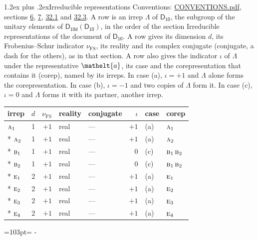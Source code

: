 \documentclass[10pt,a4paper]{article}
\makeatletter
\renewcommand\section{\@startsection{section}{1}{\z@}{-3ex plus -1ex minus -.2ex}%
  {1.2ex plus .2ex}{\normalfont\large\sffamily\bfseries\color{parttitle}}}
\newcommand{\needspace}[1]{\par\penalty-100\begingroup\dimen0=#1\relax\dimen2=\pagegoal
  \advance\dimen2-\pagetotal\ifdim\dimen0>\dimen2\relax\ifdim\dimen2>0pt\vfil\break\fi\fi
  \endgroup}
\numberwithin{equation}{section}
\newcommand{\eltfont}[1]{{\let\sigma\eltsigma\mathelt{#1}}}
\newcommand{\grp}[1]{\mathsf{#1}}
\newcommand{\irr}[1]{\text{\normalfont\scshape #1}}
\newcommand{\elt}[1]{\eltfont{#1}}
\newcommand{\fsind}{\nu_{\mathrm{FS}}}
\makeatother
\begin{document}
\section{Irreducible representations}\label{s:irreps}
Conventions: \href{../../CONVENTIONS.pdf}{CONVENTIONS.pdf}, sections \href{../../../rotation/CONVENTIONS.pdf\#conv.6}{6}, \href{../../../rotation/CONVENTIONS.pdf\#conv.7}{7}, \href{../../CONVENTIONS.pdf\#conv.32.1}{32.1} and \href{../../CONVENTIONS.pdf\#conv.32.3}{32.3}.
\leavevmode\label{n:irrep.Delta}A row is an irrep $\Lambda$ of $\grp{D_{10}}$, the subgroup of the unitary elements of $\grp{D_{10d}}(\grp{D_{10}})$, in the order of the section Irreducible representations of the document of \href{../../../rotation/data/pdf/D10.pdf}{$\grp{D_{10}}$}. \label{n:index.dimension}\label{n:index.frobenius}\label{n:head.irrep}\label{n:head.reality}\label{n:head.conjugate}A row gives its dimension $d$, its Frobenius--Schur indicator $\fsind$, its reality and its complex conjugate (conjugate, a dash for the others), as in that section. \label{n:head.case.corep}\label{n:head.corep}A row also gives the indicator $\iota$ of $\Lambda$ under the representative $\elt{a}$, its case and the corepresentation that contains it (corep), named by its irreps. In case (a), $\iota = +1$ and $\Lambda$ alone forms the corepresentation. In case (b), $\iota = -1$ and two copies of $\Lambda$ form it. In case (c), $\iota = 0$ and $\Lambda$ forms it with its partner, another irrep.
\setlength{\emergencystretch}{2em}\par\setlength{\emergencystretch}{0pt}
{\small\renewcommand{\arraystretch}{1.25}\setlength{\tabcolsep}{4pt}\begin{longtable}{@{}lrrllrll@{}}\toprule
irrep & $d$ & $\fsind$ & reality & conjugate & $\iota$ & case & corep\\\midrule\endhead
\bottomrule\endfoot\endlastfoot
$\irr{a}_{1}$ & 1 & $+1$ & real & --- & $+1$ & (a) & $\irr{a}_{1}$\\*
$\irr{a}_{2}$ & 1 & $+1$ & real & --- & $+1$ & (a) & $\irr{a}_{2}$\\*
$\irr{b}_{1}$ & 1 & $+1$ & real & --- & $0$ & (c) & $\irr{b}_{1}\,\irr{b}_{2}$\\*
$\irr{b}_{2}$ & 1 & $+1$ & real & --- & $0$ & (c) & $\irr{b}_{1}\,\irr{b}_{2}$\\*
$\irr{e}_{1}$ & 2 & $+1$ & real & --- & $+1$ & (a) & $\irr{e}_{1}$\\*
$\irr{e}_{2}$ & 2 & $+1$ & real & --- & $+1$ & (a) & $\irr{e}_{2}$\\*
$\irr{e}_{3}$ & 2 & $+1$ & real & --- & $+1$ & (a) & $\irr{e}_{3}$\\*
$\irr{e}_{4}$ & 2 & $+1$ & real & --- & $+1$ & (a) & $\irr{e}_{4}$\\
\bottomrule\end{longtable}}
\needspace{103pt}
\end{document}
